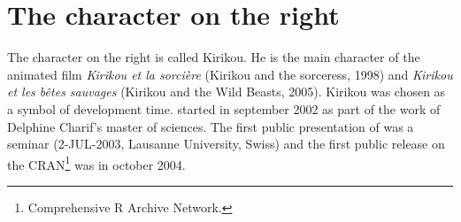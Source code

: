 \documentclass[a4paper]{article}
\begin{document}
\section*{The character on the right}

The character on the right is called Kirikou. He is the main character of the animated film \textit{Kirikou et la sorci{\`e}re}
(Kirikou and the sorceress, 1998) and \textit{Kirikou et les b{\^e}tes sauvages}
(Kirikou and the Wild Beasts, 2005). Kirikou was chosen as a symbol of \seqinr{}
development time. \Seqinr{} started in september 2002 as part of the work of
Delphine Charif's master of sciences. The first public presentation of \seqinr{}
was a seminar (2-JUL-2003, Lausanne University, Swiss) and the first public
release on the CRAN\footnote{
Comprehensive R Archive Network.
} was in october 2004.
\end{document}
